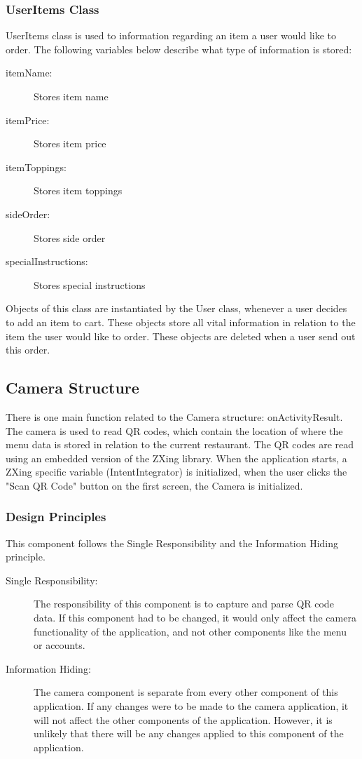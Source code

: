 \documentclass[12pt, titlepage]{article}
\begin{document}
\subsubsection{UserItems Class}
UserItems class is used to information regarding an item a user would like to order. The following variables below describe what type of information is stored: 

\begin{description}
  \item[itemName:] Stores item name
  \item[itemPrice:] Stores item price
  \item[itemToppings:] Stores item toppings
  \item[sideOrder:] Stores side order
  \item[specialInstructions:] Stores special instructions
\end{description}

Objects of this class are instantiated by the User class, whenever a user decides to add an item to cart. These objects store all vital information in relation to the item the user would like to order. These objects are deleted when a user send out this order.

\subsection{Camera Structure}
There is one main function related to the Camera structure: onActivityResult. The camera is used to read QR codes, which contain the location of where the menu data is stored in relation to the current restaurant. The QR codes are read using an embedded version of the ZXing library. When the application starts, a ZXing specific variable (IntentIntegrator) is initialized, when the user clicks the "Scan QR Code" button on the first screen, the Camera is initialized. 

\subsubsection{Design Principles}
This component follows the Single Responsibility and the Information Hiding principle.  

\begin{description}
	\item[Single Responsibility:] The responsibility of this component is to capture and parse QR code data. If this component had to be changed, it would only affect the camera functionality of the application, and not other components like the menu or accounts.
	\item[Information Hiding:] The camera component is separate from every other component of this application. If any changes were to be made to the camera application, it will not affect the other components of the application. However, it is unlikely that there will be any changes applied to this component of the application.
\end{description}
\end{document}
